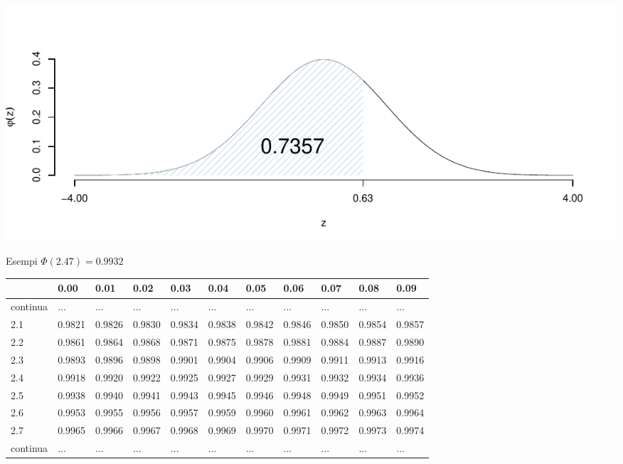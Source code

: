 \documentclass[
  11pt,
]{book}
\theoremstyle{mytheoremstyle}
\theoremstyle{mydefstyle}
\begin{document}
\begin{center}\includegraphics{Appunti_di_Statistica_2025_files/figure-latex/07c-Normale-13-1} \end{center}

Esempi \(\Phi(2.47)=0.9932\)

\begin{tabular}{llllllll|>{}l|ll}
\toprule
  & 0.00 & 0.01 & 0.02 & 0.03 & 0.04 & 0.05 & 0.06 & 0.07 & 0.08 & 0.09\\
\midrule
continua & ... & ... & ... & ... & ... & ... & ... & \textcolor[HTML]{AB292E}{...} & ... & \vphantom{1} ...\\
2.1 & 0.9821 & 0.9826 & 0.9830 & 0.9834 & 0.9838 & 0.9842 & 0.9846 & \textcolor[HTML]{AB292E}{0.9850} & 0.9854 & 0.9857\\
2.2 & 0.9861 & 0.9864 & 0.9868 & 0.9871 & 0.9875 & 0.9878 & 0.9881 & \textcolor[HTML]{AB292E}{0.9884} & 0.9887 & 0.9890\\
2.3 & 0.9893 & 0.9896 & 0.9898 & 0.9901 & 0.9904 & 0.9906 & 0.9909 & \textcolor[HTML]{AB292E}{0.9911} & 0.9913 & 0.9916\\
\midrule
\textcolor[HTML]{AB292E}{2.4} & \textcolor[HTML]{AB292E}{0.9918} & \textcolor[HTML]{AB292E}{0.9920} & \textcolor[HTML]{AB292E}{0.9922} & \textcolor[HTML]{AB292E}{0.9925} & \textcolor[HTML]{AB292E}{0.9927} & \textcolor[HTML]{AB292E}{0.9929} & \textcolor[HTML]{AB292E}{0.9931} & \textcolor[HTML]{AB292E}{0.9932} & \textcolor[HTML]{AB292E}{0.9934} & \textcolor[HTML]{AB292E}{0.9936}\\
\midrule
2.5 & 0.9938 & 0.9940 & 0.9941 & 0.9943 & 0.9945 & 0.9946 & 0.9948 & \textcolor[HTML]{AB292E}{0.9949} & 0.9951 & 0.9952\\
2.6 & 0.9953 & 0.9955 & 0.9956 & 0.9957 & 0.9959 & 0.9960 & 0.9961 & \textcolor[HTML]{AB292E}{0.9962} & 0.9963 & 0.9964\\
2.7 & 0.9965 & 0.9966 & 0.9967 & 0.9968 & 0.9969 & 0.9970 & 0.9971 & \textcolor[HTML]{AB292E}{0.9972} & 0.9973 & 0.9974\\
continua & ... & ... & ... & ... & ... & ... & ... & \textcolor[HTML]{AB292E}{...} & ... & ...\\
\bottomrule
\end{tabular}
\end{document}
